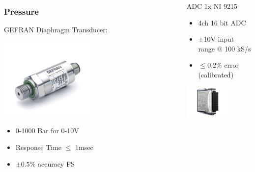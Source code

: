 \documentclass[10pt]{beamer}
\begin{document}

\begin{frame}


\begin{columns}
\begin{column}{0.5\textwidth}
  \frametitle{Pressure}
GEFRAN Diaphragm Transducer:
 \begin{center}
     \includegraphics[width=0.5\textwidth]{press}
     \end{center}
\begin{itemize}
\item 0-1000 Bar for 0-10V
\item Response Time $\leq$ 1msec
\item $\pm 0.5\%$ accuracy FS

\end{itemize}
\end{column}
\begin{column}{0.5\textwidth}  %
   
  ADC 1x NI 9215 
     
     \begin{itemize}
      \item 4ch 16 bit ADC
      \item $\pm$10V input range @ 100 kS/s
      \item $\leq 0.2\%$ error (calibrated)
      \end{itemize}
      
       \begin{center}
     \includegraphics[width=0.65\textwidth]{adc}
     \end{center}
\end{column}
\end{columns}
\end{frame}
\end{document}
